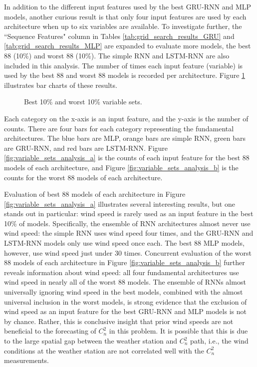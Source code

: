 In addition to the different input features used by the best \ac{GRU-RNN} and \ac{MLP} models, another curious result is that only four input features are used by each architecture when up to six variables are available. To investigate further, the ``Sequence Features" column in Tables \ref{tab:grid_search_results_GRU} and \ref{tab:grid_search_results_MLP} are expanded to evaluate more models, the best 88 (10\%) and worst 88 (10\%). The simple \ac{RNN} and \ac{LSTM-RNN} are also included in this analysis. The number of times each input feature (variable) is used by the best 88 and worst 88 models is recorded per architecture. Figure \ref{fig:variable_sets_analysis} illustrates bar charts of these results.
\begin{figure}[h!]
	\centering
	\hfill
	\caption{Best 10\% and worst 10\% variable sets.}
	\label{fig:variable_sets_analysis}
\end{figure}
Each category on the x-axis is an input feature, and the y-axis is the number of counts. There are four bars for each category representing the fundamental architectures. The blue bars are \ac{MLP}, orange bars are simple \ac{RNN}, green bars are \ac{GRU-RNN}, and red bars are \ac{LSTM-RNN}. Figure \ref{fig:variable_sets_analysis_a} is the counts of each input feature for the best 88 models of each architecture, and Figure \ref{fig:variable_sets_analysis_b} is the counts for the worst 88 models of each architecture.

Evaluation of best 88 models of each architecture in Figure \ref{fig:variable_sets_analysis_a} illustrates several interesting results, but one stands out in particular: wind speed is rarely used as an input feature in the best 10\% of models. Specifically, the ensemble of \ac{RNN} architectures almost never use wind speed: the simple \ac{RNN} uses wind speed four times, and the \ac{GRU-RNN} and \ac{LSTM-RNN} models only use wind speed once each. The best 88 \ac{MLP} models, however, use wind speed just under 30 times. Concurrent evaluation of the worst 88 models of each architecture in Figure \ref{fig:variable_sets_analysis_b} further reveals information about wind speed: all four fundamental architectures use wind speed in nearly all of the worst 88 models. The ensemble of \ac{RNN}s almost universally ignoring wind speed in the best models, combined with the almost universal inclusion in the worst models, is strong evidence that the exclusion of wind speed as an input feature for the best \ac{GRU-RNN} and \ac{MLP} models is not by chance. Rather, this is conclusive insight that prior wind speeds are not beneficial to the forecasting of $C_{n}^{2}$ in this problem. It is possible that this is due to the large spatial gap between the weather station and $C_{n}^{2}$ path, i.e., the wind conditions at the weather station are not correlated well with the $C_{n}^{2}$ measurements.

